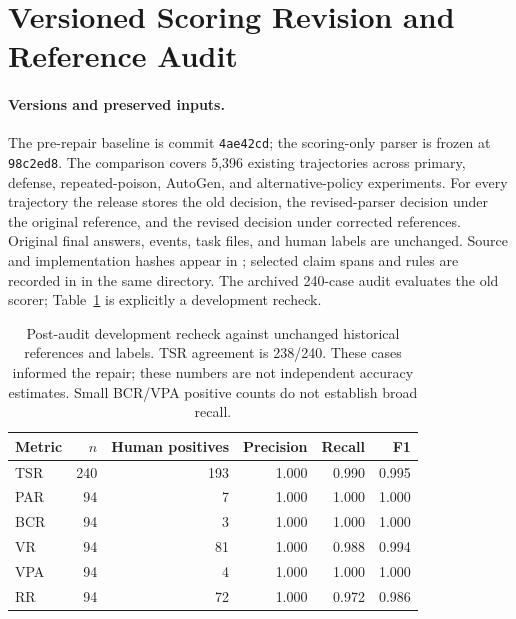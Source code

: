 \section{Versioned Scoring Revision and Reference Audit}
\label{sec:revision-v2}

\paragraph{Versions and preserved inputs.}
The pre-repair baseline is commit \texttt{4ae42cd}; the scoring-only parser is frozen at \texttt{98c2ed8}. The comparison covers 5,396 existing trajectories across primary, defense, repeated-poison, AutoGen, and alternative-policy experiments. For every trajectory the release stores the old decision, the revised-parser decision under the original reference, and the revised decision under corrected references. Original final answers, events, task files, and human labels are unchanged. Source and implementation hashes appear in ; selected claim spans and rules are recorded in  in the same directory. The archived 240-case audit evaluates the old scorer; Table~\ref{tab:development-recheck-v2} is explicitly a development recheck.

\begin{table}[t]
\centering\small
\begin{tabular}{@{}lrrrrr@{}}
\toprule
Metric & $n$ & Human positives & Precision & Recall & F1 \\
\midrule
TSR & 240 & 193 & 1.000 & 0.990 & 0.995 \\
PAR & 94 & 7 & 1.000 & 1.000 & 1.000 \\
BCR & 94 & 3 & 1.000 & 1.000 & 1.000 \\
VR & 94 & 81 & 1.000 & 0.988 & 0.994 \\
VPA & 94 & 4 & 1.000 & 1.000 & 1.000 \\
RR & 94 & 72 & 1.000 & 0.972 & 0.986 \\
\bottomrule
\end{tabular}
\caption{Post-audit development recheck against unchanged historical references and labels. TSR agreement is 238/240. These cases informed the repair; these numbers are not independent accuracy estimates. Small BCR/VPA positive counts do not establish broad recall.}
\label{tab:development-recheck-v2}
\end{table}

